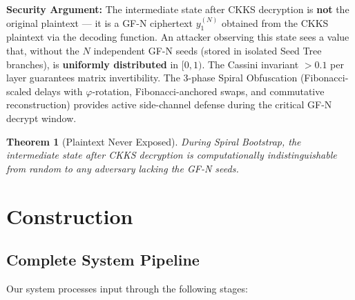 \documentclass[11pt,a4paper]{article}
\newtheorem{theorem}{Theorem}[section]
\begin{document}
\textbf{Security Argument:} The intermediate state after CKKS decryption is \textbf{not} the original plaintext — it is a GF-N ciphertext $y_1^{(N)}$ obtained from the CKKS plaintext via the decoding function. An attacker observing this state sees a value that, without the $N$ independent GF-N seeds (stored in isolated Seed Tree branches), is \textbf{uniformly distributed} in $[0,1)$. The Cassini invariant $> 0.1$ per layer guarantees matrix invertibility. The 3-phase Spiral Obfuscation (Fibonacci-scaled delays with $\varphi$-rotation, Fibonacci-anchored swaps, and commutative reconstruction) provides active side-channel defense during the critical GF-N decrypt window.

\begin{theorem}[Plaintext Never Exposed]\label{thm:noexposure}
During Spiral Bootstrap, the intermediate state after CKKS decryption is computationally indistinguishable from random to any adversary lacking the GF-N seeds.
\end{theorem}

\section{Construction}

\subsection{Complete System Pipeline}

Our system processes input through the following stages:
\end{document}

